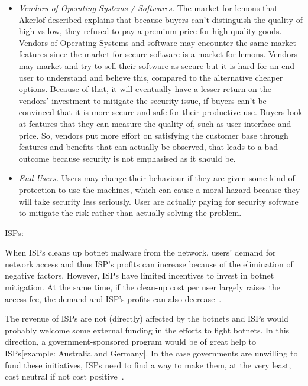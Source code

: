 \begin{itemize}
\item \textit{Vendors of Operating Systems / Softwares.} The market for lemons that Akerlof described explains that because buyers can’t distinguish the quality of high vs low, they refused to pay a premium price for high quality goods. Vendors of Operating Systems and software may encounter the same market features since the market for secure software is a market for lemons. Vendors may market and try to sell their software as secure but it is hard for an end user to understand and believe this, compared to the alternative cheaper options. Because of that, it will eventually have a lesser return on the vendors’ investment to mitigate the security issue, if buyers can’t be convinced that it is more secure and safe for their productive use. Buyers look at features that they can measure the quality of, such as user interface and price. So, vendors put more effort on satisfying the customer base through features and benefits that can actually be observed, that leads to a bad outcome because security is not emphasised as it should be.
\item \textit{End Users.} Users may change their behaviour if they are given some kind of protection to use the machines, which can cause a moral hazard because they will take security less seriously. User are actually paying for security software to mitigate the risk rather than actually solving the problem. 
\end{itemize}




ISPs:

When ISPs cleans up botnet malware from the network, users’ demand for network access and thus ISP’s profits can increase because of the elimination of negative factors. However, ISPs have limited incentives to invest in botnet mitigation. At the same time, if the clean-up cost per user largely raises the access fee, the demand and ISP’s profits can also decrease~\cite{asghari2010botnet}. 

The revenue of ISPs are not (directly) affected by the botnets and ISPs would probably welcome some external funding in the efforts to fight botnets. In this direction, a government-sponsored program would be of great help to ISPs[example: Australia and Germany]. In the case governments are unwilling to fund these initiatives, ISPs need to find a way to make them, at the very least, cost neutral if not cost positive~\cite{asghari2010botnet}. 

